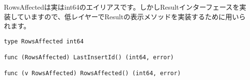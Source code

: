 RowsAffectedは実はint64のエイリアスです。しかしResultインターフェースを実装していますので、低レイヤーでResultの表示メソッドを実装するために用いられます。

\begin{lstlisting}[numbers=none]
type RowsAffected int64

func (RowsAffected) LastInsertId() (int64, error)

func (v RowsAffected) RowsAffected() (int64, error)
\end{lstlisting}

